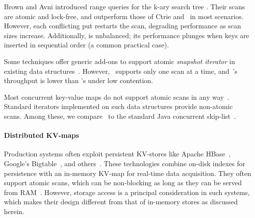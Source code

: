 
Brown and Avni \cite{BrownA12} introduced range queries for the k-ary search tree \cite{kary}.
Their scans are atomic and lock-free, and outperform those  of Ctrie and \snaptree\ in most scenarios.
However, each conflicting put restarts the scan,
degrading performance as scan sizes increase. Additionally,
\kary is unbalanced; its performance plunges when keys are inserted in sequential order
(a common practical case).

Some techniques offer generic add-ons to support atomic \emph{snapshot iterator} in existing data structures~\cite{Petrank2013, wttm2016}.
However,~\cite{Petrank2013} supports only one scan at a time, and~\cite{wttm2016}'s throughput is lower than \kary's under low contention. 

Most concurrent key-value maps do not support atomic  scans in any
way~\cite{JavaConcurrentSkipList,LinkedListBP,BraginskyP2012,Hendler04,NatarajanM2014,Kogan12,Lomet13}.
Standard iterators implemented on such data structures provide non-atomic scans. Among these, we compare \kiwi\ to the standard Java 
concurrent skip-list~\cite{Fraser04}.

\paragraph{Distributed KV-maps}
Production systems often exploit persistent KV-stores like Apache HBase~\cite{ApacheHBase},  Google's Bigtable~\cite{Chang2008}, 
and others~\cite{leveldb, RocksDB}. These technologies combine on-disk indexes for persistence with an in-memory KV-map 
for real-time data acquisition. They often support atomic scans, which can be non-blocking as long as they can be served from 
RAM~\cite{GolanGueta2015}. However, storage access is a principal consideration in such systems, which makes their design 
different from that of in-memory stores as discussed herein.

